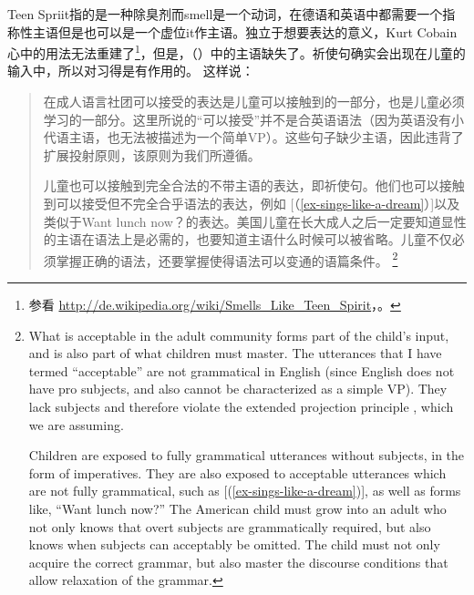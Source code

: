 \z
Teen Spriit指的是一种除臭剂而smell是一个动词，在德语和英语中都需要一个指称性主语但是也可以是一个虚位it作主语。独立于想要表达的意义，Kurt Cobain心中的用法无法重建了\footnote{%
 参看 \url{http://de.wikipedia.org/wiki/Smells_Like_Teen_Spirit}，。
}，但是，（）中的主语缺失了。祈使句确实会出现在儿童的输入中，所以对习得是有作用的。 \citet[]{Valian91a}这样说：
\begin{quotation}
在成人语言社团可以接受的表达是儿童可以接触到的一部分，也是儿童必须学习的一部分。这里所说的“可以接受”并不是合英语语法（因为英语没有小代语主语，也无法被描述为一个简单VP）。这些句子缺少主语，因此违背了扩展投射原则\citep{Chomsky81a}，该原则为我们所遵循。

儿童也可以接触到完全合法的不带主语的表达，即祈使句。他们也可以接触到可以接受但不完全合乎语法的表达，例如 [（\ref{ex-sings-like-a-dream}）]以及类似于Want lunch now？的表达。美国儿童在长大成人之后一定要知道显性的主语在语法上是必需的，也要知道主语什么时候可以被省略。儿童不仅必须掌握正确的语法，还要掌握使得语法可以变通的语篇条件。 \citep[]{Valian91a}\footnote{%
What is acceptable in the adult community forms part of the child's input, and
is also part of what children must master. The utterances that I have termed
``acceptable'' are not grammatical in English (since English does not have pro
subjects, and also cannot be characterized as a simple VP). They lack subjects
and therefore violate the extended projection principle \citep{Chomsky81a}, which we are assuming.

   Children are exposed to fully grammatical utterances without subjects, in the
form of imperatives. They are also exposed to acceptable utterances which are
not fully grammatical, such as [(\ref{ex-sings-like-a-dream})], as well as forms like, ``Want lunch now?'' The
American child must grow into an adult who not only knows that overt subjects
are grammatically required, but also knows when subjects can acceptably be
omitted. The child must not only acquire the correct grammar, but also master
the discourse conditions that allow relaxation of the grammar.}
\end{quotation}
